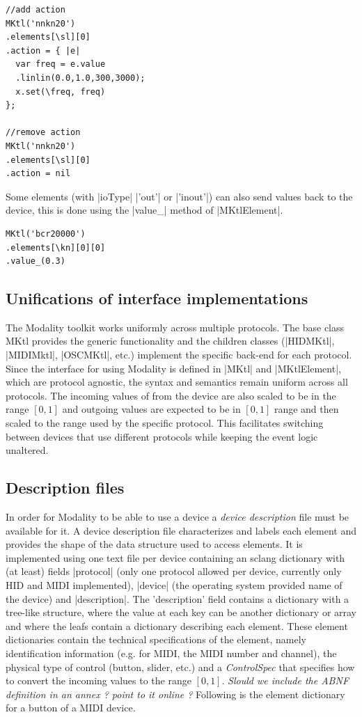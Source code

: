 \documentclass{article}
\begin{document}
\begin{Verbatim}
//add action
MKtl('nnkn20')
.elements[\sl][0]
.action = { |e|
  var freq = e.value
  .linlin(0.0,1.0,300,3000);
  x.set(\freq, freq)
};

//remove action
MKtl('nnkn20')
.elements[\sl][0]
.action = nil
\end{Verbatim}

Some elements (with |ioType| |'out'| or |'inout'|) can also send values back to the device, this is done using the |value_| method of |MKtlElement|.

\begin{Verbatim}
MKtl('bcr20000')
.elements[\kn][0][0]
.value_(0.3)
\end{Verbatim}

\subsection{Unifications of interface implementations}
\label{sub:unifications_of_interface_implementations}

The Modality toolkit works uniformly across multiple protocols. The base class MKtl provides the generic functionality and the children classes (|HIDMKtl|, |MIDIMktl|, |OSCMKtl|, etc.) implement the specific back-end for each protocol. Since the interface for using Modality is defined in |MKtl| and |MKtlElement|, which are protocol agnostic, the syntax and semantics remain uniform across all protocols. The incoming values of from the device are also scaled to be in the range $[0,1]$ and outgoing values are expected to be in $[0,1]$ range and then scaled to the range used by the specific protocol. This facilitates switching between devices that use different protocols while keeping the event logic unaltered.

\subsection{Description files}
\label{sub:descriptions_files}

In order for Modality to be able to use a device a \textit{device description} file must be available for it.  A device description file characterizes and labels each element and provides the shape of the data structure used to access elements. It is implemented using one text file per device containing an sclang dictionary with (at least) fields |protocol| (only one protocol allowed per device, currently only HID and MIDI implemented), |device| (the operating system provided name of the device) and |description|. The 'description' field contains a dictionary with a tree-like structure, where the value at each key can be another dictionary or array and where the leafs contain a dictionary describing each element. These element dictionaries contain the technical specifications of the element, namely identification information (e.g. for MIDI, the MIDI number and channel), the physical type of control (button, slider, etc.) and a \textit{ControlSpec} that specifies how to convert the incoming values to the range $[0,1]$.   \emph{Slould we include the ABNF definition  in an annex ? point to it online ?} Following is the element dictionary for a button of a MIDI device.
\end{document}
